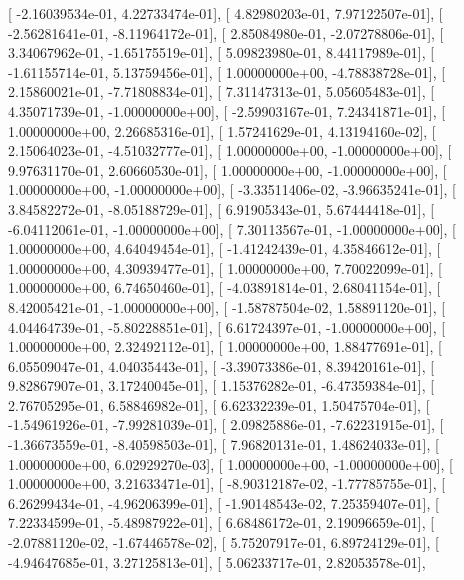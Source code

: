 \documentclass{article}
\begin{document}
       [ -2.16039534e-01,   4.22733474e-01],
       [  4.82980203e-01,   7.97122507e-01],
       [ -2.56281641e-01,  -8.11964172e-01],
       [  2.85084980e-01,  -2.07278806e-01],
       [  3.34067962e-01,  -1.65175519e-01],
       [  5.09823980e-01,   8.44117989e-01],
       [ -1.61155714e-01,   5.13759456e-01],
       [  1.00000000e+00,  -4.78838728e-01],
       [  2.15860021e-01,  -7.71808834e-01],
       [  7.31147313e-01,   5.05605483e-01],
       [  4.35071739e-01,  -1.00000000e+00],
       [ -2.59903167e-01,   7.24341871e-01],
       [  1.00000000e+00,   2.26685316e-01],
       [  1.57241629e-01,   4.13194160e-02],
       [  2.15064023e-01,  -4.51032777e-01],
       [  1.00000000e+00,  -1.00000000e+00],
       [  9.97631170e-01,   2.60660530e-01],
       [  1.00000000e+00,  -1.00000000e+00],
       [  1.00000000e+00,  -1.00000000e+00],
       [ -3.33511406e-02,  -3.96635241e-01],
       [  3.84582272e-01,  -8.05188729e-01],
       [  6.91905343e-01,   5.67444418e-01],
       [ -6.04112061e-01,  -1.00000000e+00],
       [  7.30113567e-01,  -1.00000000e+00],
       [  1.00000000e+00,   4.64049454e-01],
       [ -1.41242439e-01,   4.35846612e-01],
       [  1.00000000e+00,   4.30939477e-01],
       [  1.00000000e+00,   7.70022099e-01],
       [  1.00000000e+00,   6.74650460e-01],
       [ -4.03891814e-01,   2.68041154e-01],
       [  8.42005421e-01,  -1.00000000e+00],
       [ -1.58787504e-02,   1.58891120e-01],
       [  4.04464739e-01,  -5.80228851e-01],
       [  6.61724397e-01,  -1.00000000e+00],
       [  1.00000000e+00,   2.32492112e-01],
       [  1.00000000e+00,   1.88477691e-01],
       [  6.05509047e-01,   4.04035443e-01],
       [ -3.39073386e-01,   8.39420161e-01],
       [  9.82867907e-01,   3.17240045e-01],
       [  1.15376282e-01,  -6.47359384e-01],
       [  2.76705295e-01,   6.58846982e-01],
       [  6.62332239e-01,   1.50475704e-01],
       [ -1.54961926e-01,  -7.99281039e-01],
       [  2.09825886e-01,  -7.62231915e-01],
       [ -1.36673559e-01,  -8.40598503e-01],
       [  7.96820131e-01,   1.48624033e-01],
       [  1.00000000e+00,   6.02929270e-03],
       [  1.00000000e+00,  -1.00000000e+00],
       [  1.00000000e+00,   3.21633471e-01],
       [ -8.90312187e-02,  -1.77785755e-01],
       [  6.26299434e-01,  -4.96206399e-01],
       [ -1.90148543e-02,   7.25359407e-01],
       [  7.22334599e-01,  -5.48987922e-01],
       [  6.68486172e-01,   2.19096659e-01],
       [ -2.07881120e-02,  -1.67446578e-02],
       [  5.75207917e-01,   6.89724129e-01],
       [ -4.94647685e-01,   3.27125813e-01],
       [  5.06233717e-01,   2.82053578e-01],
\end{document}
